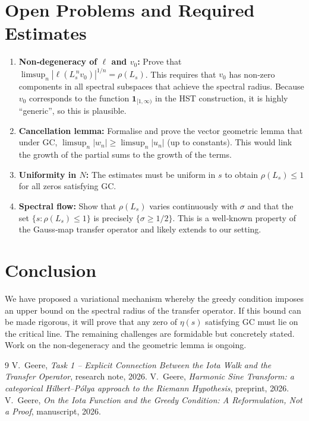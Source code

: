 \documentclass[11pt,a4paper]{article}
\begin{document}
\section{Open Problems and Required Estimates}
\begin{enumerate}
\item \textbf{Non‑degeneracy of $\ell$ and $v_0$:} Prove that $\limsup_n |\ell(L_s^{\,n} v_0)|^{1/n} = \rho(L_s)$.  This requires that $v_0$ has non‑zero components in all spectral subspaces that achieve the spectral radius.  Because $v_0$ corresponds to the function $\mathbf{1}_{[1,\infty)}$ in the HST construction, it is highly ``generic'', so this is plausible.
\item \textbf{Cancellation lemma:} Formalise and prove the vector geometric lemma that under GC, $\limsup_n |w_n| \ge \limsup_n |u_n|$ (up to constants).  This would link the growth of the partial sums to the growth of the terms.
\item \textbf{Uniformity in $N$:} The estimates must be uniform in $s$ to obtain $\rho(L_s) \le 1$ for all zeros satisfying GC.
\item \textbf{Spectral flow:} Show that $\rho(L_s)$ varies continuously with $\sigma$ and that the set $\{ s : \rho(L_s) \le 1 \}$ is precisely $\{ \sigma \ge 1/2 \}$.  This is a well‑known property of the Gauss‑map transfer operator and likely extends to our setting.
\end{enumerate}

\section{Conclusion}
We have proposed a variational mechanism whereby the greedy condition imposes an upper bound on the spectral radius of the transfer operator.  If this bound can be made rigorous, it will prove that any zero of $\eta(s)$ satisfying GC must lie on the critical line.  The remaining challenges are formidable but concretely stated.  Work on the non‑degeneracy and the geometric lemma is ongoing.

\begin{thebibliography}{9}
 V.\ Geere, \emph{Task 1 -- Explicit Connection Between the Iota Walk and the Transfer Operator}, research note, 2026.
 V.\ Geere, \emph{Harmonic Sine Transform: a categorical Hilbert--Pólya approach to the Riemann Hypothesis}, preprint, 2026.
 V.\ Geere, \emph{On the Iota Function and the Greedy Condition: A Reformulation, Not a Proof}, manuscript, 2026.
\end{thebibliography}
\end{document}
